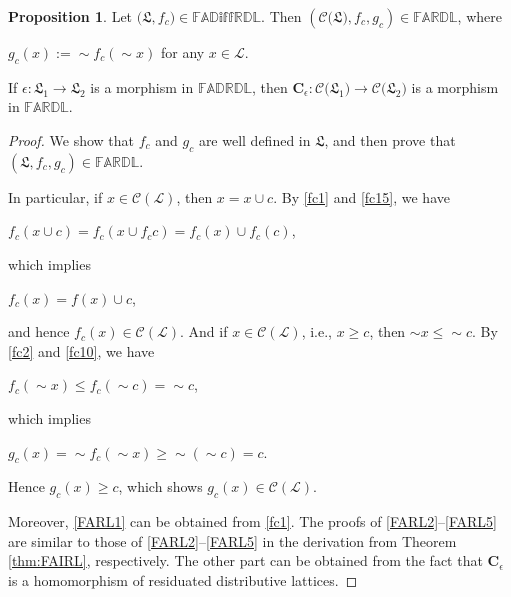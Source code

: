 \documentclass[final,12pt,times]{elsarticle}
\theoremstyle{plain}
\theoremstyle{definition}
\newtheorem{proposition}[definition]{Proposition}
\theoremstyle{break}
\begin{document}
\begin{proposition}\label{proposition5.7.} Let $\boldsymbol{(\mathfrak{L}},f_c)\in \mathbb{FAD\text{iff}RDL}$. Then $(\mathcal{C\boldsymbol{(\mathfrak{L}})},f_c,g_c)\in\mathbb{FARDL}$, where
\begin{center} $g_c(x):=\sim f_c(\sim x)$ for any $x\in \mathcal{L}$.
\end{center}
If
$\epsilon:\boldsymbol{\mathfrak{L}}_1\rightarrow \boldsymbol{\mathfrak{L}}_2$  is a morphism in $\mathbb{FADRDL}$, then
$\mathbf{C}_\epsilon:\mathcal{C\boldsymbol{(\mathfrak{L_\text{1}}})}\rightarrow \mathcal{C\boldsymbol{(\mathfrak{L_\text{2}}})}$ is a morphism in $\mathbb{FARDL}$.
\end{proposition}
\begin{proof} We show that $f_c$ and $g_c$ are well defined in $\boldsymbol{\mathfrak{L}}$, and then prove that 
$(\boldsymbol{\mathfrak{L}},f_c,g_c)\in\mathbb{FARDL}$.  

In particular, if $x\in \mathcal{C(L)}$, then $x=x\cup c$. By \eqref{fc1} and \ref{fc15}, we have
\begin{center} $f_c(x\cup c)=f_c(x\cup f_c c)=f_c (x)\cup f_c(c)$, 
\end{center} which implies
\begin{center}$f_c(x)=f(x)\cup c$,
\end{center} and hence $f_c(x)\in\mathcal{C(L)}$. And if $x\in \mathcal{C(L)}$, i.e., $x\geq c$, then ${\sim} x\leq {\sim} c$. By  \eqref{fc2} and \ref{fc10}, we have
\begin{center} $f_c(\sim x)\leq f_c(\sim c)=\sim c$,
\end{center} which implies
\begin{center} $g_c(x)=\sim f_c(\sim x)\geq {\sim}({\sim} c)=c$.
\end{center} Hence $g_c(x)\geq c$, which shows $g_c(x)\in \mathcal{C(L)}$.


Moreover, \eqref{FARL1} can be obtained from \eqref{fc1}.
The proofs of \eqref{FARL2}--\eqref{FARL5}  are similar to those of \eqref{FARL2}--\eqref{FARL5} in the derivation from Theorem \ref{thm:FAIRL}, respectively. The other part can be obtained from the fact that $\mathbf{C}_\epsilon$ is a homomorphism of residuated distributive lattices.
\end{proof}
\end{document}
